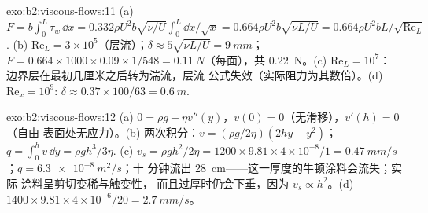 \begin{solution}{exo:b2:viscous-flows:11}
(a) $F = b\int_0^L\tau_w\,\dd x = 0.332\rho U^2b\sqrt{\nu/U}\int_0^L\dd x/\sqrt x =
0.664\rho U^2b\sqrt{\nu L/U} = 0.664\rho U^2bL/\sqrt{\mathrm{Re}_L}$. (b) $\mathrm{Re}_L =
3 \times 10^5$（层流）；$\delta \approx 5\sqrt{\nu L/U} = \qty{9}{mm}$；$F = 0.664 \times 1000
\times 0.09 \times 1/548 = \qty{0.11}{N}$（每面），共 \qty{0.22}{N}。(c) $\mathrm{Re}_L = 10^7$：
边界层在最初几厘米之后转为湍流，层流
公式失效（实际阻力为其数倍）。(d) $\mathrm{Re}_x =
10^9$: $\delta \approx 0.37 \times 100/63 = \qty{0.6}{m}$.
\end{solution}

\begin{solution}{exo:b2:viscous-flows:12}
(a) $0 = \rho g + \eta v''(y)$，$v(0) = 0$（无滑移），$v'(h) = 0$（自由
表面处无应力）。(b) 两次积分：$v = (\rho g/2\eta)(2hy - y^2)$；$q =
\int_0^hv\,\dd y = \rho gh^3/3\eta$. (c) $v_s = \rho gh^2/2\eta = 1200 \times 9.81 \times
4 \times 10^{-8}/1 = \qty{0.47}{mm/s}$；$q = \qty{6.3e-8}{m^2/s}$；十
分钟流出 \qty{28}{cm}——这一厚度的牛顿涂料会流失；实际
涂料呈剪切变稀与触变性，
而且过厚时仍会下垂，因为 $v_s \propto h^2$。(d) $1400 \times 9.81 \times 4 \times 10^{-6}/20 = \qty{2.7}{mm/s}$。
\end{solution}

